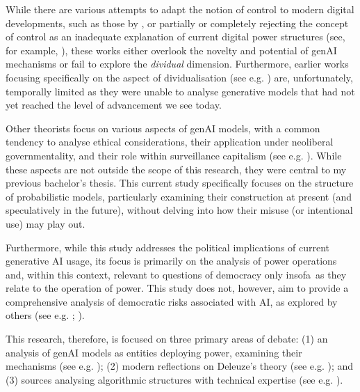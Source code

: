 While there are various attempts to adapt the notion of control to modern
digital developments, such as those by \cite{brusseau2020}, or partially or completely rejecting the concept of control as an inadequate explanation of current digital power structures (see, for example, \cite{hui2015}), these works either overlook the novelty and potential of genAI mechanisms or fail to explore the \textit{dividual} dimension.  Furthermore, earlier works focusing specifically on the aspect of dividualisation (see e.g. \cite{Cheney2011, Otterlo2013}) are, unfortunately, temporally limited as they were unable to analyse generative models that had not yet reached the level of advancement we see today.

Other theorists focus on various aspects of genAI models, with a common tendency to analyse ethical considerations, their application under neoliberal governmentality, and their role within surveillance capitalism (see e.g. \cite{zuboff2019, gillespie2024, Haggerty2000}). While these aspects are not outside the scope of this research, they were central to my previous bachelor's thesis.  This current study specifically focuses on the structure of probabilistic models, particularly examining their construction at present (and speculatively in the future), without delving into how their misuse (or intentional use) may play out.

Furthermore, while this study addresses the political implications of current generative AI usage, its focus is primarily on the analysis of power operations and, within this context, relevant to questions of democracy only insofa\ as they relate to the operation of power.  This study does not, however, aim to provide a comprehensive analysis of democratic risks associated with AI, as explored by others (see e.g. \cite{zarkadakes2020}; \cite{coeckelbergh2024a}).

This research, therefore, is focused on three primary areas of debate: (1) an analysis of genAI models as entities deploying power, examining their mechanisms (see e.g. \cite{amoore2024, konik2015, mackenzie2021}); (2) modern reflections on Deleuze's theory (see e.g. \cite{mischke2021, poster2010}); and (3) sources analysing algorithmic structures with technical expertise (see e.g. \cite{vaswani2017a, bender2021b}).


%




